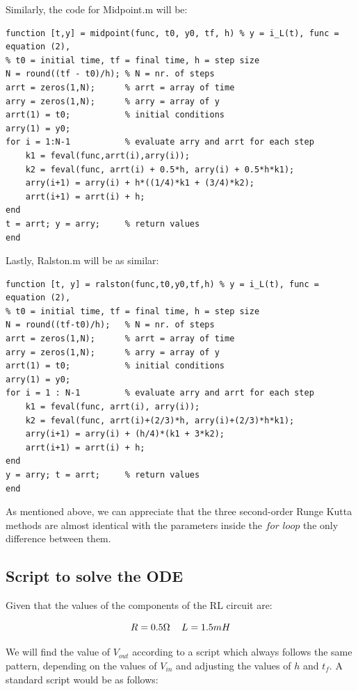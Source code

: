 \documentclass[11pt,a4paper]{article}
\begin{document}
\vspace{-2mm}Similarly, the code for Midpoint.m will be:
\vspace{-1mm}
\begin{verbatim}
function [t,y] = midpoint(func, t0, y0, tf, h) % y = i_L(t), func = equation (2),
% t0 = initial time, tf = final time, h = step size
N = round((tf - t0)/h); % N = nr. of steps
arrt = zeros(1,N);      % arrt = array of time
arry = zeros(1,N);      % arry = array of y
arrt(1) = t0;           % initial conditions
arry(1) = y0;
for i = 1:N-1           % evaluate arry and arrt for each step
    k1 = feval(func,arrt(i),arry(i));
    k2 = feval(func, arrt(i) + 0.5*h, arry(i) + 0.5*h*k1);
    arry(i+1) = arry(i) + h*((1/4)*k1 + (3/4)*k2);
    arrt(i+1) = arrt(i) + h;
end
t = arrt; y = arry;     % return values
end
\end{verbatim}

Lastly, Ralston.m will be as similar:

\begin{verbatim}
function [t, y] = ralston(func,t0,y0,tf,h) % y = i_L(t), func = equation (2),
% t0 = initial time, tf = final time, h = step size
N = round((tf-t0)/h);   % N = nr. of steps
arrt = zeros(1,N);      % arrt = array of time
arry = zeros(1,N);      % arry = array of y
arrt(1) = t0;           % initial conditions
arry(1) = y0;
for i = 1 : N-1         % evaluate arry and arrt for each step
    k1 = feval(func, arrt(i), arry(i));
    k2 = feval(func, arrt(i)+(2/3)*h, arry(i)+(2/3)*h*k1);
    arry(i+1) = arry(i) + (h/4)*(k1 + 3*k2);
    arrt(i+1) = arrt(i) + h;
end
y = arry; t = arrt;     % return values
end
\end{verbatim}

As mentioned above, we can appreciate that the three second-order Runge Kutta methods are almost identical with the parameters inside the $for$ $loop$ the only difference between them.

\newpage
\subsection{Script to solve the ODE}
Given that the values of the components of the RL circuit are:

\[R = 0.5\Omega\ \hspace{3mm} L = 1.5mH\]

We will find the value of $V_{out}$ according to a script which always follows the same pattern, depending on the values of $V_{in}$ and adjusting the values of $h$ and $t_f$. A standard script would be as follows:
\end{document}
